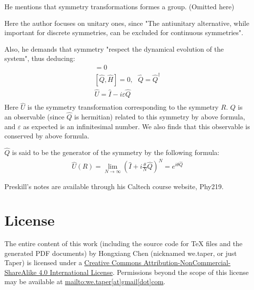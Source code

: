 \documentclass{article}
\numberwithin{equation}{subsection} %
\theoremstyle{definition}
\begin{document}
    He mentions that symmetry transformations formes a group. (Omitted here)

    Here the author focuses on unitary ones, since "The antiunitary
    alternative, while important for discrete symmetries, can be 
    excluded for continuous symmetries".

    Also, he demands that symmetry "respect the dynamical evolution of 
    the system", thus deducing:
    \begin{align}
        [\hat{U}(R),\hat{H}] = 0 \\
        [\hat{Q},\hat{H}] = 0,\text{ }\hat{Q} = \hat{Q}^\dagger \\
        \hat{U} = \hat{I} - i\varepsilon \hat{Q} \\
    \end{align}
    Here $\hat{U}$ is the symmetry transformation corresponding to the
    symmetry $R$. $Q$ is an observable (since $\hat{Q}$ is hermitian)
    related to this symmetry by above formula, and $\varepsilon$ as
    expected is an infinitesimal number. We also finds that this
    observable is conserved by above formula.

    $\hat{Q}$ is said to be the generator
    of the symmetry by the following formula:
    \begin{align}
        \label{eq:}
        \hat{U}(R) = 
          \lim_{N\to \infty}(\hat{I}+i\frac{\theta}{N}\hat{Q})^N
          = e^{i\theta \hat{Q}}
    \end{align}

\begin{thebibliography}{1}
     Preskill's notes are available through his Caltech
    course website, Phy219.
\end{thebibliography}
\printnomenclature
\section{License}
The entire content of this work (including the source code
for TeX files and the generated PDF documents) by 
Hongxiang Chen (nicknamed we.taper, or just Taper) is
licensed under a 
\href{http://creativecommons.org/licenses/by-nc-sa/4.0/}{Creative 
Commons Attribution-NonCommercial-ShareAlike 4.0 International 
License}. Permissions beyond the scope of this 
license may be available at \url{mailto:we.taper[at]gmail[dot]com}.
\end{document}
